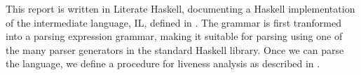 This report is written in Literate Haskell, documenting a Haskell
implementation of the intermediate language, IL, defined in \cite[Section 3.2
(p.  36)]{torben}. The grammar is first tranformed into a parsing expression
grammar, making it suitable for parsing using one of the many parser generators
in the standard Haskell library. Once we can parse the language, we define a
procedure for liveness analysis as described in \cite[Section 3.4
(p.38)]{torben}.

